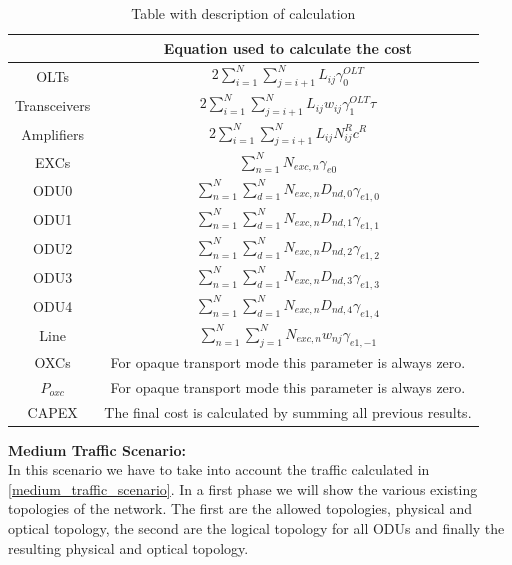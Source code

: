 \begin{table}[h!]
\centering
\begin{tabular}{|| c | c ||}
 \hline
  & Equation used to calculate the cost \\ \hline
 OLTs & \(\displaystyle 2 \sum_{i=1}^{N}\sum_{j=i+1}^{N} L_{ij} \gamma_0^{OLT} \) \\ \hline
 Transceivers & \(\displaystyle 2 \sum_{i=1}^{N}\sum_{j=i+1}^{N} L_{ij} w_{ij} \gamma_1^{OLT} \tau \) \\ \hline
 Amplifiers & \(\displaystyle 2 \sum_{i=1}^{N}\sum_{j=i+1}^{N} L_{ij} N^R_{ij} c^R \) \\ \hline
 EXCs & \(\displaystyle \sum_{n=1}^N N_{exc,n} \gamma_{e0} \) \\ \hline
 ODU0 & \(\displaystyle \sum_{n=1}^{N} \sum_{d=1}^{N} N_{exc,n} D_{nd,0} \gamma_{e1,0} \) \\ \hline
 ODU1 & \(\displaystyle \sum_{n=1}^{N} \sum_{d=1}^{N} N_{exc,n} D_{nd,1} \gamma_{e1,1} \) \\ \hline
 ODU2 & \(\displaystyle \sum_{n=1}^{N} \sum_{d=1}^{N} N_{exc,n} D_{nd,2} \gamma_{e1,2} \)\\ \hline
 ODU3 & \(\displaystyle \sum_{n=1}^{N} \sum_{d=1}^{N} N_{exc,n} D_{nd,3} \gamma_{e1,3} \) \\ \hline
 ODU4 & \(\displaystyle \sum_{n=1}^{N} \sum_{d=1}^{N} N_{exc,n} D_{nd,4} \gamma_{e1,4} \) \\ \hline
 Line & \(\displaystyle \sum_{n=1}^{N} \sum_{j=1}^{N} N_{exc,n} w_{nj} \gamma_{e1,-1} \) \\ \hline
 OXCs & For opaque transport mode this parameter is always zero. \\ \hline
 $P_{oxc}$ & For opaque transport mode this parameter is always zero. \\ \hline
 CAPEX & The final cost is calculated by summing all previous results. \\
 \hline
 \end{tabular}
\caption{Table with description of calculation}
\label{formulas_opaque_protec_ref_low_heuristic}
\end{table}

\newpage
\textbf{Medium Traffic Scenario:}\\

In this scenario we have to take into account the traffic calculated in \ref{medium_traffic_scenario}. In a first phase we will show the various existing topologies of the network. The first are the allowed topologies, physical and optical topology, the second are the logical topology for all ODUs and finally the resulting physical and optical topology.\\

